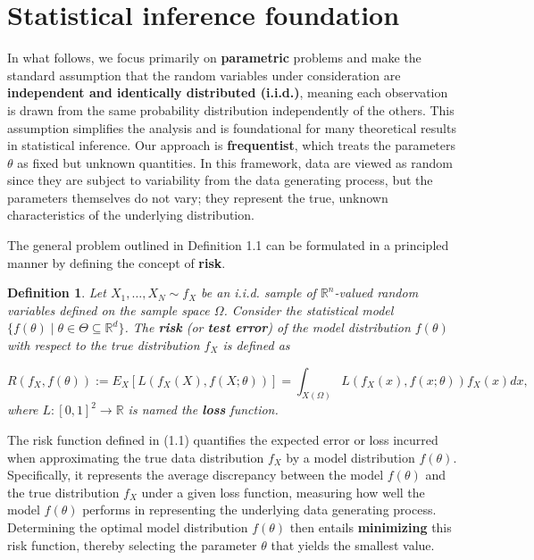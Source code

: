 \documentclass{report}
\newtheorem{definition}{Definition}[chapter]
\begin{document}
\section{Statistical inference foundation}
In what follows, we focus primarily on \textbf{parametric} problems and make the standard assumption that the random variables under consideration are \textbf{independent and identically distributed (i.i.d.)}, meaning each observation is drawn from the same probability distribution independently of the others. This assumption simplifies the analysis and is foundational for many theoretical results in statistical inference. Our approach is \textbf{frequentist}, which treats the parameters $\theta$ as fixed but unknown quantities. In this framework, data are viewed as random since they are subject to variability from the data generating process, but the parameters themselves do not vary; they represent the true, unknown characteristics of the underlying distribution.

The general problem outlined in Definition 1.1 can be formulated in a principled manner by defining the concept of \textbf{risk}.

\begin{definition}
Let $X_1,\dots,X_N \sim f_X$ be an i.i.d. sample of $\mathbb{R}^n$-valued random variables defined on the sample space $\Omega$. Consider the statistical model $\{f(\theta) \mid\theta\in\Theta\subseteq\mathbb{R}^d\}$. The \textbf{risk} (or \textbf{test error}) of the model distribution $f(\theta)$ with respect to the true distribution $f_X$ is defined as

\begin{equation}
R(f_X,f(\theta)) := E_X[L(f_X(X),f(X;\theta))] = \int_{X(\Omega)} L(f_X(x),f(x;\theta))f_X(x)dx,
\end{equation}
where $L : [0,1]^2 \to \mathbb{R}$ is named the \textbf{loss} function.
\end{definition}
The risk function defined in (1.1) quantifies the expected error or loss incurred when approximating the true data distribution $f_X$ by a model distribution $f(\theta)$. Specifically, it represents the average discrepancy between the model $f(\theta)$ and the true distribution $f_X$ under a given loss function, measuring how well the model $f(\theta)$ performs in representing the underlying data generating process. Determining the optimal model distribution $f(\theta)$ then entails \textbf{minimizing} this risk function, thereby selecting the parameter $\theta$ that yields the smallest value.
\end{document}
